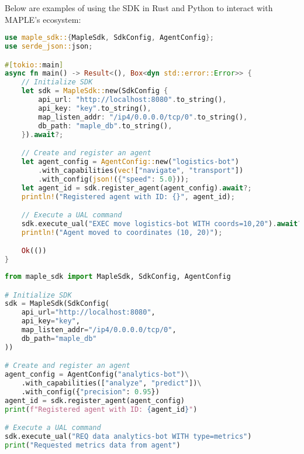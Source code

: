 \documentclass[a4paper,11pt]{article}
\begin{document}
Below are examples of using the SDK in Rust and Python to interact with MAPLE’s ecosystem:

\begin{lstlisting}[language=Rust, caption={Rust SDK Example}, label={lst:sdk-rust}]
use maple_sdk::{MapleSdk, SdkConfig, AgentConfig};
use serde_json::json;

#[tokio::main]
async fn main() -> Result<(), Box<dyn std::error::Error>> {
    // Initialize SDK
    let sdk = MapleSdk::new(SdkConfig {
        api_url: "http://localhost:8080".to_string(),
        api_key: "key".to_string(),
        map_listen_addr: "/ip4/0.0.0.0/tcp/0".to_string(),
        db_path: "maple_db".to_string(),
    }).await?;

    // Create and register an agent
    let agent_config = AgentConfig::new("logistics-bot")
        .with_capabilities(vec!["navigate", "transport"])
        .with_config(json!({"speed": 5.0}));
    let agent_id = sdk.register_agent(agent_config).await?;
    println!("Registered agent with ID: {}", agent_id);

    // Execute a UAL command
    sdk.execute_ual("EXEC move logistics-bot WITH coords=10,20").await?;
    println!("Agent moved to coordinates (10, 20)");

    Ok(())
}
\end{lstlisting}
\vspace{0.5cm}

\begin{lstlisting}[language=Python, caption={Python SDK Example}, label={lst:sdk-python}]
from maple_sdk import MapleSdk, SdkConfig, AgentConfig

# Initialize SDK
sdk = MapleSdk(SdkConfig(
    api_url="http://localhost:8080",
    api_key="key",
    map_listen_addr="/ip4/0.0.0.0/tcp/0",
    db_path="maple_db"
))

# Create and register an agent
agent_config = AgentConfig("analytics-bot")\
    .with_capabilities(["analyze", "predict"])\
    .with_config({"precision": 0.95})
agent_id = sdk.register_agent(agent_config)
print(f"Registered agent with ID: {agent_id}")

# Execute a UAL command
sdk.execute_ual("REQ data analytics-bot WITH type=metrics")
print("Requested metrics data from agent")
\end{lstlisting}
\vspace{0.5cm}
\end{document}
